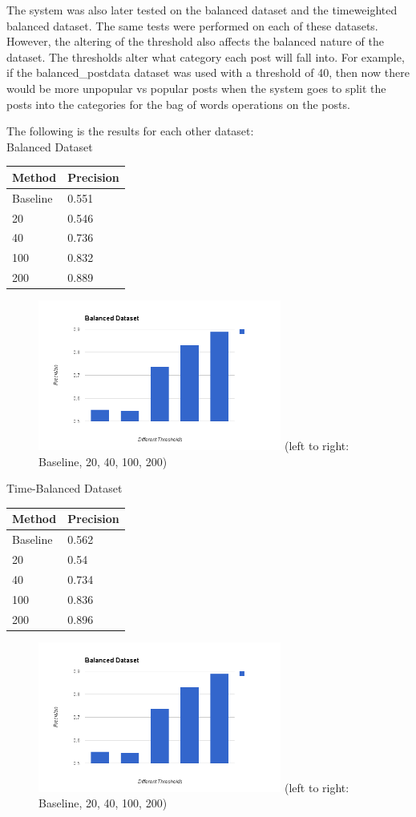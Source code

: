 \documentclass{acm_proc_article-sp}
\begin{document}
The system was also later tested on the balanced dataset and the timeweighted balanced dataset. The same tests were performed on each of these datasets. However, the altering of the threshold also affects the balanced nature of the dataset. The thresholds alter what category each post will fall into. For example, if the balanced\_postdata dataset was used with a threshold of 40, then now there would be more unpopular vs popular posts when the system goes to split the posts into the categories for the bag of words operations on the posts. 

The following is the results for each other dataset:\\
Balanced Dataset\\
\begin{tabular}{l|l}
Method & Precision\\
\hline
Baseline & 0.551\\
20 & 0.546\\
40 & 0.736\\
100 & 0.832\\
200 & 0.889\\
\end{tabular}

\begin{figure}[h!]
\includegraphics[width=8cm]{balanced-dataset-keyword.png}
(left to right: Baseline, 20, 40, 100, 200)
\end{figure}

Time-Balanced Dataset\\
\begin{tabular}{l|l}
Method & Precision\\
\hline
Baseline & 0.562\\
20 & 0.54\\
40 & 0.734\\
100 & 0.836\\
200 & 0.896\\
\end{tabular}

\begin{figure}[h!]
\includegraphics[width=8cm]{time-balanced-dataset-keyword.png}
(left to right: Baseline, 20, 40, 100, 200)
\end{figure}
\end{document}
